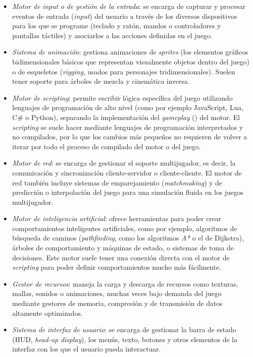 \begin{itemize}
\item \textit{Motor de input o de gestión de la entrada}: se encarga de capturar y procesar eventos de entrada (\textit{input}) del usuario a través de los diversos dispositivos para los que se programe (teclado y ratón, mandos o controladores y pantallas táctiles) y asociarlos a las acciones definidas en el juego.
\item \textit{Sistema de animación}: gestiona animaciones de \textit{sprites} (los elementos gráficos bidimensionales básicos que representan visualmente objetos dentro del juego) o de esqueletos (\textit{rigging}, usados para personajes tridimensionales). Suelen tener soporte para árboles de mezcla y cinemática inversa.
\item \textit{Motor de scripting}: permite escribir lógica específica del juego utilizando lenguajes de programación de alto nivel (como por ejemplo JavaScript, Lua, C\# o Python), separando la implementación del \textit{gameplay} () del motor. El \textit{scripting} se suele hacer mediante lenguajes de programación interpretados y no compilados, por lo que los cambios más pequeños no requieren de volver a iterar por todo el proceso de compilado del motor o del juego.
\item \textit{Motor de red}: se encarga de gestionar el soporte multijugador, es decir, la comunicación y sincronización cliente-servidor o cliente-cliente. El motor de red también incluye sistemas de emparejamiento (\textit{matchmaking}) y de predicción o interpolación del juego para una simulación fluida en los juegos multijugador.
\item \textit{Motor de inteligencia artificial}: ofrece herramientas para poder crear comportamientos inteligentes artificiales, como por ejemplo, algoritmos de búsqueda de caminos (\textit{pathfinding}, como los algoritmos \textit{A*} o el de Dijkstra), árboles de comportamiento y máquinas de estado, o sistemas de toma de decisiones. Este motor suele tener una conexión directa con el motor de \textit{scripting} para poder definir comportamientos mucho más fácilmente.
\item \textit{Gestor de recursos}: maneja la carga y descarga de recursos como texturas, mallas, sonidos o animaciones, muchas veces bajo demanda del juego mediante gestores de memoria, compresión y de transmisión de datos altamente optimizados.
\item \textit{Sistema de interfaz de usuario}: se encarga de gestionar la barra de estado (HUD, \textit{head-up display}), los menús, texto, botones y otros elementos de la interfaz con los que el usuario pueda interactuar.
\end{itemize}

